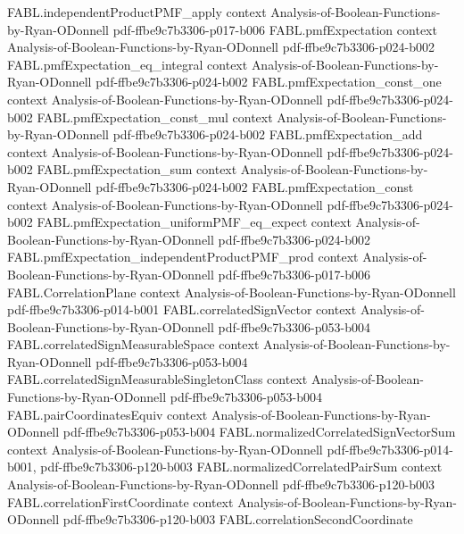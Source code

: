 \begin{theorem}
\proofstep
  {FABL.independentProductPMF_apply}
  {context}
  {Analysis-of-Boolean-Functions-by-Ryan-ODonnell}
  {pdf-ffbe9c7b3306-p017-b006}
\proofstep
  {FABL.pmfExpectation}
  {context}
  {Analysis-of-Boolean-Functions-by-Ryan-ODonnell}
  {pdf-ffbe9c7b3306-p024-b002}
\proofstep
  {FABL.pmfExpectation_eq_integral}
  {context}
  {Analysis-of-Boolean-Functions-by-Ryan-ODonnell}
  {pdf-ffbe9c7b3306-p024-b002}
\proofstep
  {FABL.pmfExpectation_const_one}
  {context}
  {Analysis-of-Boolean-Functions-by-Ryan-ODonnell}
  {pdf-ffbe9c7b3306-p024-b002}
\proofstep
  {FABL.pmfExpectation_const_mul}
  {context}
  {Analysis-of-Boolean-Functions-by-Ryan-ODonnell}
  {pdf-ffbe9c7b3306-p024-b002}
\proofstep
  {FABL.pmfExpectation_add}
  {context}
  {Analysis-of-Boolean-Functions-by-Ryan-ODonnell}
  {pdf-ffbe9c7b3306-p024-b002}
\proofstep
  {FABL.pmfExpectation_sum}
  {context}
  {Analysis-of-Boolean-Functions-by-Ryan-ODonnell}
  {pdf-ffbe9c7b3306-p024-b002}
\proofstep
  {FABL.pmfExpectation_const}
  {context}
  {Analysis-of-Boolean-Functions-by-Ryan-ODonnell}
  {pdf-ffbe9c7b3306-p024-b002}
\proofstep
  {FABL.pmfExpectation_uniformPMF_eq_expect}
  {context}
  {Analysis-of-Boolean-Functions-by-Ryan-ODonnell}
  {pdf-ffbe9c7b3306-p024-b002}
\proofstep
  {FABL.pmfExpectation_independentProductPMF_prod}
  {context}
  {Analysis-of-Boolean-Functions-by-Ryan-ODonnell}
  {pdf-ffbe9c7b3306-p017-b006}
\proofstep
  {FABL.CorrelationPlane}
  {context}
  {Analysis-of-Boolean-Functions-by-Ryan-ODonnell}
  {pdf-ffbe9c7b3306-p014-b001}
\proofstep
  {FABL.correlatedSignVector}
  {context}
  {Analysis-of-Boolean-Functions-by-Ryan-ODonnell}
  {pdf-ffbe9c7b3306-p053-b004}
\proofstep
  {FABL.correlatedSignMeasurableSpace}
  {context}
  {Analysis-of-Boolean-Functions-by-Ryan-ODonnell}
  {pdf-ffbe9c7b3306-p053-b004}
\proofstep
  {FABL.correlatedSignMeasurableSingletonClass}
  {context}
  {Analysis-of-Boolean-Functions-by-Ryan-ODonnell}
  {pdf-ffbe9c7b3306-p053-b004}
\proofstep
  {FABL.pairCoordinatesEquiv}
  {context}
  {Analysis-of-Boolean-Functions-by-Ryan-ODonnell}
  {pdf-ffbe9c7b3306-p053-b004}
\proofstep
  {FABL.normalizedCorrelatedSignVectorSum}
  {context}
  {Analysis-of-Boolean-Functions-by-Ryan-ODonnell}
  {pdf-ffbe9c7b3306-p014-b001,
    pdf-ffbe9c7b3306-p120-b003}
\proofstep
  {FABL.normalizedCorrelatedPairSum}
  {context}
  {Analysis-of-Boolean-Functions-by-Ryan-ODonnell}
  {pdf-ffbe9c7b3306-p120-b003}
\proofstep
  {FABL.correlationFirstCoordinate}
  {context}
  {Analysis-of-Boolean-Functions-by-Ryan-ODonnell}
  {pdf-ffbe9c7b3306-p120-b003}
\proofstep
  {FABL.correlationSecondCoordinate}

\end{theorem}
